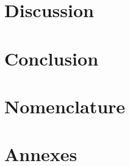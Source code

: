 \documentclass[11pt]{report}
\begin{document}
\chapter{Discussion}


\chapter{Conclusion}


\chapter{Nomenclature}


\printbibliography

\chapter{Annexes}

\end{document}
